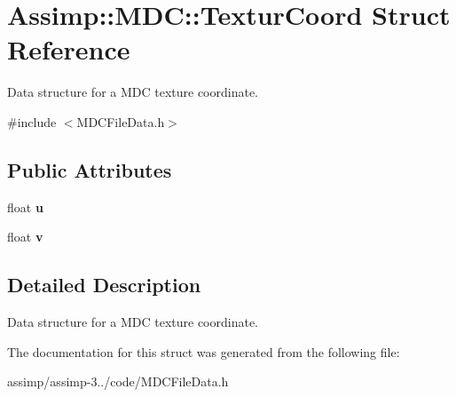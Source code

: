 \hypertarget{struct_assimp_1_1_m_d_c_1_1_textur_coord}{\section{Assimp\+:\+:M\+D\+C\+:\+:Textur\+Coord Struct Reference}
\label{struct_assimp_1_1_m_d_c_1_1_textur_coord}
}


Data structure for a M\+D\+C texture coordinate.  




{\ttfamily \#include $<$M\+D\+C\+File\+Data.\+h$>$}

\subsection*{Public Attributes}
\begin{DoxyCompactItemize}
\item 
\hypertarget{struct_assimp_1_1_m_d_c_1_1_textur_coord_afecea598af33e76df9002dde1da09c02}{float {\bfseries u}}\label{struct_assimp_1_1_m_d_c_1_1_textur_coord_afecea598af33e76df9002dde1da09c02}

\item 
\hypertarget{struct_assimp_1_1_m_d_c_1_1_textur_coord_a0c98cb260e48a4d61f860df5db2fd29a}{float {\bfseries v}}\label{struct_assimp_1_1_m_d_c_1_1_textur_coord_a0c98cb260e48a4d61f860df5db2fd29a}

\end{DoxyCompactItemize}


\subsection{Detailed Description}
Data structure for a M\+D\+C texture coordinate. 

The documentation for this struct was generated from the following file\+:\begin{DoxyCompactItemize}
\item 
assimp/assimp-\/3../code/M\+D\+C\+File\+Data.\+h\end{DoxyCompactItemize}
